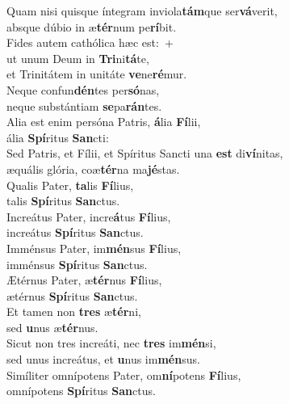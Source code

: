 \evenverse Quam nisi quisque íntegram inviola\textbf{tám}que ser\textbf{vá}verit,~\*\\
\evenverse absque dúbio in æ\textbf{tér}num pe\textbf{rí}bit.\\
\oddverse Fides autem cathólica hæc est:~+\\
\oddverse  ut unum Deum in \textbf{Tri}ni\textbf{tá}te,~\*\\
\oddverse et Trinitátem in unitáte \textbf{ve}ne\textbf{ré}mur.\\
\evenverse Neque confun\textbf{dén}tes per\textbf{só}nas,~\*\\
\evenverse neque substántiam \textbf{se}pa\textbf{rán}tes.\\
\oddverse Alia est enim persóna Patris, \textbf{á}lia \textbf{Fí}lii,~\*\\
\oddverse ália \textbf{Spí}ritus \textbf{San}cti:\\
\evenverse Sed Patris, et Fílii, et Spíritus Sancti una \textbf{est} di\textbf{ví}nitas,~\*\\
\evenverse æquális glória, coæ\textbf{tér}na ma\textbf{jé}stas.\\
\oddverse Qualis Pater, \textbf{ta}lis \textbf{Fí}lius,~\*\\
\oddverse talis \textbf{Spí}ritus \textbf{San}ctus.\\
\evenverse Increátus Pater, incre\textbf{á}tus \textbf{Fí}lius,~\*\\
\evenverse increátus \textbf{Spí}ritus \textbf{San}ctus.\\
\oddverse Imménsus Pater, im\textbf{mén}sus \textbf{Fí}lius,~\*\\
\oddverse imménsus \textbf{Spí}ritus \textbf{San}ctus.\\
\evenverse Ætérnus Pater, æ\textbf{tér}nus \textbf{Fí}lius,~\*\\
\evenverse ætérnus \textbf{Spí}ritus \textbf{San}ctus.\\
\oddverse Et tamen non \textbf{tres} æ\textbf{tér}ni,~\*\\
\oddverse sed \textbf{u}nus æ\textbf{tér}nus.\\
\evenverse Sicut non tres increáti, nec \textbf{tres} im\textbf{mén}si,~\*\\
\evenverse sed unus increátus, et \textbf{u}nus im\textbf{mén}sus.\\
\oddverse Simíliter omnípotens Pater, om\textbf{ní}potens \textbf{Fí}lius,~\*\\
\oddverse omnípotens \textbf{Spí}ritus \textbf{San}ctus.\\
